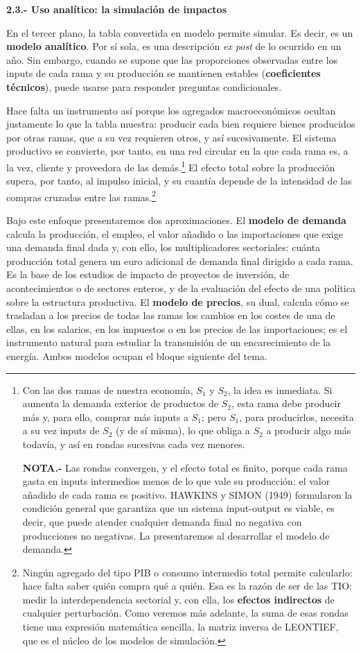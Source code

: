 \documentclass[10pt,a4paper]{article}
\begin{document}
\textbf{2.3.- Uso analítico: la simulación de impactos}

En el tercer plano, la tabla convertida en modelo permite simular. Es decir, es un \textbf{modelo analítico}. Por sí sola, es una descripción \textit{ex post} de lo ocurrido en un año. Sin embargo, cuando se supone que las proporciones observadas entre los inputs de cada rama y su producción se mantienen estables (\textbf{coeficientes técnicos}), puede usarse para responder preguntas condicionales.

Hace falta un instrumento así porque los agregados macroeconómicos ocultan justamente lo que la tabla muestra: producir cada bien requiere bienes producidos por otras ramas, que a su vez requieren otros, y así sucesivamente. El sistema productivo se convierte, por tanto, en una red circular en la que cada rama es, a la vez, cliente y proveedora de las demás.\footnote{%
    Con las dos ramas de nuestra economía, $S_1$ y $S_2$, la idea es inmediata. Si aumenta la demanda exterior de productos de $S_2$, esta rama debe producir más y, para ello, comprar más inputs a $S_1$; pero $S_1$, para producirlos, necesita a su vez inputs de $S_2$ (y de sí misma), lo que obliga a $S_2$ a producir algo más todavía, y así en rondas sucesivas cada vez menores.

    \textbf{NOTA.-} Las rondas convergen, y el efecto total es finito, porque cada rama gasta en inputs intermedios menos de lo que vale su producción: el valor añadido de cada rama es positivo. HAWKINS y SIMON (1949) formularon la condición general que garantiza que un sistema input-output es viable, es decir, que puede atender cualquier demanda final no negativa con producciones no negativas. La presentaremos al desarrollar el modelo de demanda.
} El efecto total sobre la producción supera, por tanto, al impulso inicial, y su cuantía depende de la intensidad de las compras cruzadas entre las ramas.\footnote{%
  Ningún agregado del tipo PIB o consumo intermedio total permite calcularlo: hace falta saber quién compra qué a quién. Esa es la razón de ser de las TIO: medir la interdependencia sectorial y, con ella, los \textbf{efectos indirectos} de cualquier perturbación. Como veremos más adelante, la suma de esas rondas tiene una expresión matemática sencilla, la matriz inversa de LEONTIEF, que es el núcleo de los modelos de simulación.
}

Bajo este enfoque presentaremos dos aproximaciones. El \textbf{modelo de demanda} calcula la producción, el empleo, el valor añadido o las importaciones que exige una demanda final dada y, con ello, los multiplicadores sectoriales: cuánta producción total genera un euro adicional de demanda final dirigido a cada rama. Es la base de los estudios de impacto de proyectos de inversión, de acontecimientos o de sectores enteros, y de la evaluación del efecto de una política sobre la estructura productiva. El \textbf{modelo de precios}, su dual, calcula cómo se trasladan a los precios de todas las ramas los cambios en los costes de una de ellas, en los salarios, en los impuestos o en los precios de las importaciones; es el instrumento natural para estudiar la transmisión de un encarecimiento de la energía. Ambos modelos ocupan el bloque siguiente del tema.
\end{document}
